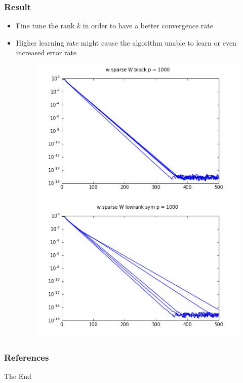 \documentclass{beamer}
\begin{document}
\begin{frame}
\frametitle{Result}
\begin{itemize}
  \item Fine tune the rank $k$ in order to have a better convergence rate
  \item Higher learning rate might cause the algorithm unable to learn or even increased error rate
  \begin{figure}[htbp]
  \centering
  \begin{minipage}{0.45\textwidth}
    \centering
    \includegraphics[width=.9\textwidth]{images/gfm/w_sparse_W_block_p_100.png}
  \end{minipage}
  \hfill
  \begin{minipage}{0.45\textwidth}
    \centering
    \includegraphics[width=.9\textwidth]{images/gfm/w_sparse_W_lowrank_sym_p_100.png}
  \end{minipage}
  \end{figure}
\end{itemize}

  
\end{frame}


\begin{frame}[allowframebreaks]
\frametitle{References}
\footnotesize
 

\end{frame}


\begin{frame}
\Huge{\centerline{The End}}
\end{frame}

\end{document}
